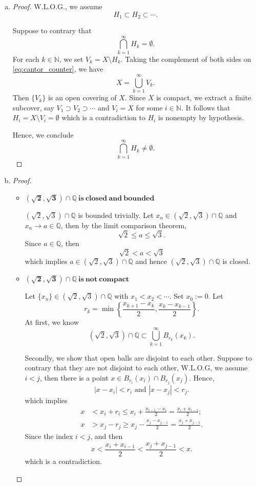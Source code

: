 \begin{Exercise}
\begin{enumerate}[a)]
\item
\begin{proof}
W.L.O.G., we assume
$$
H_1 \subset H_2 \subset \cdots.
$$

Suppose to contrary that
\begin{equation}\label{eq:cantor_counter}
\bigcap_{k=1}^{\infty}H_k = \emptyset.
\end{equation}
For each $k\in\mathbb{N}$, we set $V_k = X\setminus H_k$. Taking the complement of both sides on \eqref{eq:cantor_counter}, we have
$$
X = \bigcup_{k=1}^{\infty}V_k.
$$
Then $\{V_k\}$ is an open covering of $X$. Since $X$ is compact, we extract a finite subcover, say $V_1 \supset V_2 \supset \cdots$ and $V_i = X$ for some $i\in\mathbb{N}$. It follows that $H_i = X\setminus V_i = \emptyset$ which is a contradiction to $H_i$ is nonempty by hypothesis.

Hence, we conclude
$$
\bigcap_{k=1}^{\infty}H_k \neq \emptyset.
$$
\end{proof}

\item
\begin{proof}
\begin{itemize}
\item $\mathbf{(\sqrt{2}, \sqrt{3})\cap \mathbb{Q}\  is\ closed\ and\ bounded}$

$(\sqrt{2}, \sqrt{3})\cap \mathbb{Q}$ is bounded trivially. Let $x_n\in(\sqrt{2}, \sqrt{3})\cap \mathbb{Q}$ and $x_n\to a \in \mathbb{Q}$, then by the limit comparison theorem,
$$
\sqrt{2} \leq a \leq \sqrt{3}.
$$
Since $a\in\mathbb{Q}$, then
$$
\sqrt{2} < a < \sqrt{3}
$$
which implies $a\in(\sqrt{2}, \sqrt{3})\cap \mathbb{Q}$ and hence $(\sqrt{2}, \sqrt{3})\cap \mathbb{Q}$ is closed.

\item $\mathbf{(\sqrt{2}, \sqrt{3})\cap \mathbb{Q}\  is\ not\ compact}$

Let $\{x_n\}\in(\sqrt{2}, \sqrt{3})\cap \mathbb{Q}$ with $x_1<x_2<\cdots$. Set $x_0 := 0$. Let 
$$
r_k=\min\left\{\frac{x_{k+1}-x_k}{2}, \frac{x_k-x_{k-1}}{2}\right\}.
$$
At first, we know
$$
(\sqrt{2}, \sqrt{3})\cap \mathbb{Q} \subset \bigcup_{k=1}^{\infty} B_{r_k}(x_k).
$$

Secondly, we show that open balls are disjoint to each other. Suppose to contrary that they are not disjoint to each other, W.L.O.G, we assume $i<j$, then there is a point $x\in B_{r_i}(x_i)\cap B_{r_j}(x_j)$. Hence,
$$
\left| x-x_i \right| < r_i \text{ and } \left| x-x_j \right| < r_j.
$$
which implies
\begin{align*}
x &< x_i+r_i \leq x_i+\frac{x_{i-1}-x_i}{2} = \frac{x_i+x_{i-1}}{2}; \\
x &> x_j-r_j \geq x_j-\frac{x_j-x_{j-1}}{2} = \frac{x_j+x_{j-1}}{2}.
\end{align*}
Since the index $i<j$, and then
$$
x < \frac{x_i+x_{i-1}}{2} < \frac{x_j+x_{j-1}}{2} < x.
$$
which is a contradiction.


\end{itemize}
\end{proof}
\end{enumerate}
\end{Exercise}
